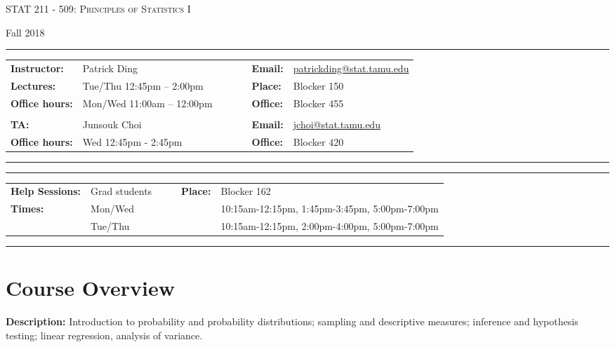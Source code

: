 \documentclass[11pt, a4paper]{article}
\begin{document}
\begin{center}
{\Large \textsc{STAT 211 - 509: Principles of Statistics I}}
\end{center}
\begin{center}
Fall 2018
\end{center}

\begin{center}
\rule{\textwidth}{0.4pt}
\begin{minipage}[t]{\textwidth}
\begin{tabular}{llcccll}
\textbf{Instructor:} & Patrick Ding & & &  & \textbf{Email:} & \url{patrickding@stat.tamu.edu} 
\\
\textbf{Lectures:} &  Tue/Thu 12:45pm -- 2:00pm & & & & \textbf{Place:} & Blocker 150
\\
\textbf{Office hours:} & Mon/Wed 11:00am -- 12:00pm   & & & & \textbf{Office:} & Blocker 455
\\\\
\textbf{TA:} & Junsouk Choi & & & & \textbf{Email:} & \url{jchoi@stat.tamu.edu}
\\
\textbf{Office hours:} & Wed 12:45pm - 2:45pm   & & & & \textbf{Office:} & Blocker 420 
\end{tabular}
\end{minipage}
\rule{\textwidth}{0.4pt}
\end{center}

\begin{center}
\rule{\textwidth}{0.4pt}
\begin{minipage}[t]{\textwidth}
\begin{tabular}{llccll}
\textbf{Help Sessions:} & Grad students & & & \textbf{Place:} & Blocker 162
\\
\textbf{Times:} & Mon/Wed & & & & 10:15am-12:15pm, 1:45pm-3:45pm, 5:00pm-7:00pm
\\
 & Tue/Thu & & & & 10:15am-12:15pm, 2:00pm-4:00pm, 5:00pm-7:00pm
\end{tabular}
\end{minipage}
\rule{\textwidth}{0.4pt}
\end{center}

\section{Course Overview}

\noindent\textbf{Description:} 
Introduction to probability and probability distributions; sampling and descriptive measures; inference and hypothesis testing; linear regression, analysis of variance. 
\end{document}
